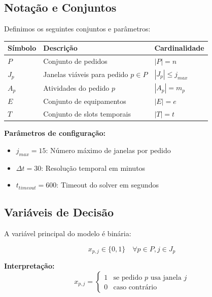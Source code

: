 \documentclass[11pt,a4paper]{article}
\begin{document}
\subsection{Notação e Conjuntos}

Definimos os seguintes conjuntos e parâmetros:

\begin{center}
\begin{tabular}{lll}
\toprule
\textbf{Símbolo} & \textbf{Descrição} & \textbf{Cardinalidade} \\
\midrule
$P$ & Conjunto de pedidos & $|P| = n$ \\
$J_p$ & Janelas viáveis para pedido $p \in P$ & $|J_p| \leq j_{max}$ \\
$A_p$ & Atividades do pedido $p$ & $|A_p| = m_p$ \\
$E$ & Conjunto de equipamentos & $|E| = e$ \\
$T$ & Conjunto de slots temporais & $|T| = t$ \\
\bottomrule
\end{tabular}
\end{center}

\textbf{Parâmetros de configuração:}
\begin{itemize}
    \item $j_{max} = 15$: Número máximo de janelas por pedido
    \item $\Delta t = 30$: Resolução temporal em minutos
    \item $t_{timeout} = 600$: Timeout do solver em segundos
\end{itemize}

\subsection{Variáveis de Decisão}

A variável principal do modelo é binária:

\begin{equation}
x_{p,j} \in \{0, 1\} \quad \forall p \in P, j \in J_p
\end{equation}

\textbf{Interpretação:}
\begin{equation}
x_{p,j} = \begin{cases}
1 & \text{se pedido } p \text{ usa janela } j \\
0 & \text{caso contrário}
\end{cases}
\end{equation}
\end{document}
